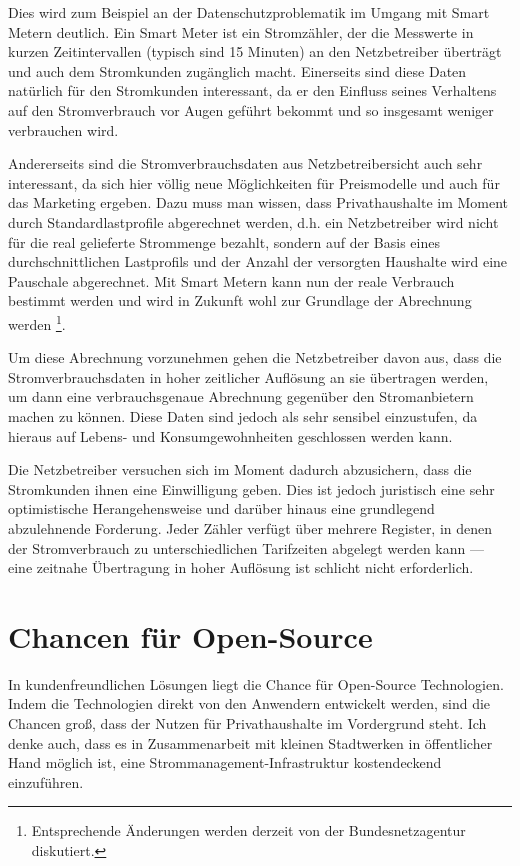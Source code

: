 \documentclass[12pt,BCOR=8.5mm]{scrartcl}
\begin{document}
Dies wird zum Beispiel an der Datenschutzproblematik im Umgang mit Smart
Metern deutlich. Ein Smart Meter ist ein Stromzähler, der die Messwerte
in kurzen Zeitintervallen (typisch sind 15 Minuten) an den Netzbetreiber
überträgt und auch dem Stromkunden zugänglich macht. Einerseits sind
diese Daten natürlich für den Stromkunden interessant, da er den
Einfluss seines Verhaltens auf den Stromverbrauch vor Augen geführt
bekommt und so insgesamt weniger verbrauchen wird.

Andererseits sind die Stromverbrauchsdaten aus Netzbetreibersicht auch
sehr interessant, da sich hier völlig neue Möglichkeiten für
Preismodelle und auch für das Marketing ergeben. Dazu muss man wissen,
dass Privathaushalte im Moment durch Standardlastprofile abgerechnet
werden, d.h. ein Netzbetreiber wird nicht für die real gelieferte
Strommenge bezahlt, sondern auf der Basis eines durchschnittlichen
Lastprofils und der Anzahl der versorgten Haushalte wird eine Pauschale
abgerechnet. Mit Smart Metern kann nun der reale Verbrauch bestimmt
werden und wird in Zukunft wohl zur Grundlage der Abrechnung werden
\footnote{Entsprechende Änderungen werden derzeit von der
Bundesnetzagentur diskutiert.}. 

Um diese Abrechnung vorzunehmen gehen die Netzbetreiber davon aus, dass
die Stromverbrauchsdaten in hoher zeitlicher Auflösung an sie
übertragen werden, um dann eine verbrauchsgenaue Abrechnung gegenüber
den Stromanbietern machen zu können.
Diese Daten sind jedoch als sehr sensibel einzustufen, da hieraus auf
Lebens- und Konsumgewohnheiten geschlossen werden kann.

Die Netzbetreiber versuchen sich im Moment dadurch abzusichern, dass die
Stromkunden ihnen eine Einwilligung geben. Dies ist jedoch juristisch
eine sehr optimistische Herangehensweise  und darüber hinaus eine grundlegend abzulehnende Forderung.
Jeder Zähler verfügt über mehrere Register, in denen der Stromverbrauch
zu unterschiedlichen Tarifzeiten abgelegt werden kann --- eine zeitnahe
Übertragung in hoher Auflösung ist schlicht nicht erforderlich.

\section{Chancen für Open-Source}\label{sec:chancen_open-source}
In kundenfreundlichen Lösungen liegt die Chance für Open-Source
Technologien. Indem die Technologien direkt von den Anwendern entwickelt
werden, sind die Chancen groß, dass der Nutzen für Privathaushalte im
Vordergrund steht.  Ich denke auch, dass es in Zusammenarbeit mit
kleinen Stadtwerken in öffentlicher Hand möglich ist, eine
Strommanagement-Infrastruktur kostendeckend einzuführen.
\end{document}
